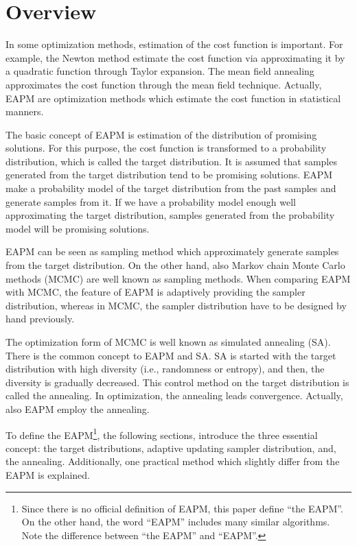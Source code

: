 \section{Overview}
In some optimization methods,
estimation of the cost function is important.
For example,
the Newton method estimate the cost function 
via approximating it by a quadratic function through Taylor expansion.
The mean field annealing approximates the cost function
through the mean field technique.
Actually, EAPM are optimization methods
which estimate the cost function in statistical manners.

The basic concept of EAPM
is estimation of the distribution of promising solutions.
For this purpose, the cost function is transformed
to a probability distribution, which is called the target distribution.
It is assumed that
samples generated from the target distribution tend to be promising solutions.
EAPM make a probability model of the target distribution 
from the past samples
and
generate samples from it.
If we have a probability model enough well approximating the target
distribution,
samples generated from the probability model will be promising solutions.

EAPM can be seen as sampling method which approximately generate
samples from the target distribution.
On the other hand, 
 also Markov chain Monte Carlo methods (MCMC) are well known as
sampling methods.
When comparing EAPM with MCMC,
the feature of EAPM is adaptively providing 
the sampler distribution,
whereas in MCMC, the sampler distribution have to be 
designed by hand previously.

The optimization form of MCMC is well known as
simulated annealing (SA).
There is the common concept to EAPM and SA.
SA is started with the 
target distribution with high diversity (i.e., randomness or entropy),
and then, the diversity is gradually decreased.
This control method on the target distribution
is called the annealing.
In optimization, the annealing leads  convergence.
Actually, also EAPM employ the annealing.


To define the EAPM\footnote{
Since there is no official definition of EAPM,
this paper define ``the EAPM''.
On the other hand, the word ``EAPM'' includes many similar algorithms.
Note the difference between ``the EAPM'' and ``EAPM''.
},
the following sections,
introduce the three essential concept:
the target distributions, 
adaptive updating sampler distribution, and, the annealing.
Additionally,
one practical method which slightly differ from the EAPM
is explained.


